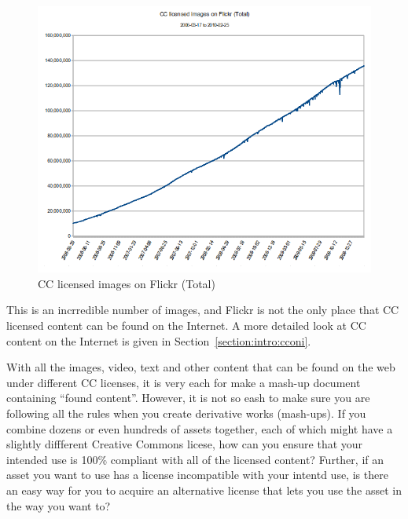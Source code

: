 \documentclass[botnum,fleqn,final]{unmeethesis}
\begin{document}
\begin{figure}[!htpb]
    \begin{center}
            \includegraphics[width=1.0\textwidth]{cc-flickr-total-20100225.png}
    \end{center}
    \caption[CC licensed image on Flickr (Total)]{CC licensed images on Flickr (Total)}
    \label{fi:CC-growth-on-Flickr}
\end{figure}

This is an incrredible number of images, and Flickr is not the only place that
CC licensed content can be found on the Internet.  A more detailed look at CC
content on the Internet is given in Section~\ref{section:intro:cconi}.

With all the images, video, text and other content that can be found on the web
under different CC licenses, it is very each for make a mash-up document
containing ``found content''.  However, it is not so eash to make sure you are
following all the rules when you create derivative works (mash-ups).  If you
combine dozens or even hundreds of assets together, each of which might have a
slightly diffferent Creative Commons licese, how can you ensure that your
intended use is 100\% compliant with all of the licensed content?  Further, if
an asset you want to use has a license incompatible with your intentd use, is
there an easy way for you to acquire an alternative license that lets you use
the asset in the way you want to? 


\end{document}
